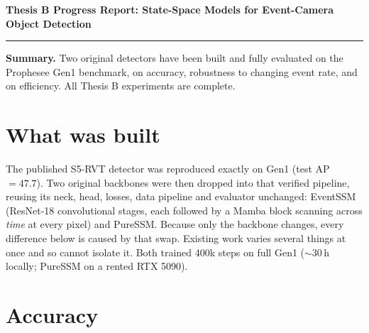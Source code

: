 \documentclass[10pt,a4paper]{article}
\begin{document}
\begin{center}
{\large\bfseries Thesis B Progress Report: State-Space Models for Event-Camera Object Detection}\\[2pt]
\end{center}
\vspace{-3pt}
\hrule
\vspace{2pt}

\textbf{Summary.} Two original detectors have been built and fully evaluated on the Prophesee Gen1 benchmark, on accuracy,  robustness to changing event rate, and on efficiency. All Thesis B experiments are complete.

\section{What was built}

The published S5-RVT detector was reproduced exactly on Gen1 (test AP $=47.7$). Two original backbones were
then dropped into that verified pipeline, reusing its neck, head, losses, data pipeline and evaluator
unchanged: EventSSM (ResNet-18 convolutional stages, each followed by a Mamba block
scanning across \emph{time} at every pixel) and PureSSM.
Because only the backbone changes, every difference below is caused by that swap. Existing work varies
several things at once and so cannot isolate it. Both trained 400k steps on full Gen1 (${\sim}30$\,h locally;
PureSSM on a rented RTX 5090).

\section{Accuracy}
\end{document}
